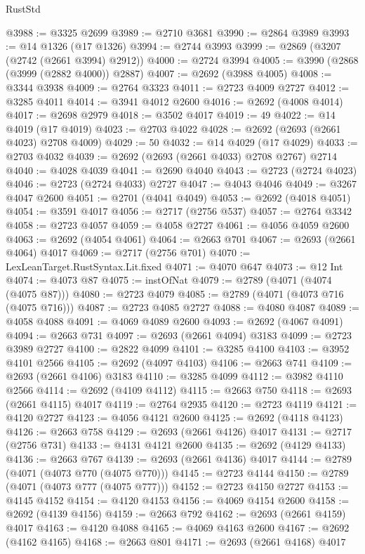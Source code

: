 \begin{lexlean}{RustStd}
\begin{coremodule}
@3988 := @3325 @2699
@3989 := @2710 @3681
@3990 := @2864 @3989
@3993 := @14 @1326 (@17 @1326)
@3994 := @2744 @3993
@3999 := @2869 (@3207 (@2742 (@2661 @3994) @2912))
@4000 := @2724 @3994
@4005 := @3990 (@2868 (@3999 (@2882 @4000)) @2887)
@4007 := @2692 (@3988 @4005)
@4008 := @3344 @3938
@4009 := @2764 @3323
@4011 := @2723 @4009 @2727
@4012 := @3285 @4011
@4014 := @3941 @4012 @2600
@4016 := @2692 (@4008 @4014)
@4017 := @2698 @2979
@4018 := @3502 @4017
@4019 := 49
@4022 := @14 @4019 (@17 @4019)
@4023 := @2703 @4022
@4028 := @2692 (@2693 (@2661 @4023) @2708 @4009)
@4029 := 50
@4032 := @14 @4029 (@17 @4029)
@4033 := @2703 @4032
@4039 := @2692 (@2693 (@2661 @4033) @2708 @2767) @2714
@4040 := @4028 @4039
@4041 := @2690 @4040
@4043 := @2723 (@2724 @4023)
@4046 := @2723 (@2724 @4033) @2727
@4047 := @4043 @4046
@4049 := @3267 @4047 @2600
@4051 := @2701 (@4041 @4049)
@4053 := @2692 (@4018 @4051)
@4054 := @3591 @4017
@4056 := @2717 (@2756 @537)
@4057 := @2764 @3342
@4058 := @2723 @4057
@4059 := @4058 @2727
@4061 := @4056 @4059 @2600
@4063 := @2692 (@4054 @4061)
@4064 := @2663 @701
@4067 := @2693 (@2661 @4064) @4017
@4069 := @2717 (@2756 @701)
@4070 := LexLeanTarget.RustSyntax.Lit.fixed
@4071 := @4070 @647
@4073 := @12 Int
@4074 := @4073 @87
@4075 := instOfNat
@4079 := @2789 (@4071 (@4074 (@4075 @87)))
@4080 := @2723 @4079
@4085 := @2789 (@4071 (@4073 @716 (@4075 @716)))
@4087 := @2723 @4085 @2727
@4088 := @4080 @4087
@4089 := @4058 @4088
@4091 := @4069 @4089 @2600
@4093 := @2692 (@4067 @4091)
@4094 := @2663 @731
@4097 := @2693 (@2661 @4094) @3183
@4099 := @2723 @3989 @2727
@4100 := @2822 @4099
@4101 := @3285 @4100
@4103 := @3952 @4101 @2566
@4105 := @2692 (@4097 @4103)
@4106 := @2663 @741
@4109 := @2693 (@2661 @4106) @3183
@4110 := @3285 @4099
@4112 := @3982 @4110 @2566
@4114 := @2692 (@4109 @4112)
@4115 := @2663 @750
@4118 := @2693 (@2661 @4115) @4017
@4119 := @2764 @2935
@4120 := @2723 @4119
@4121 := @4120 @2727
@4123 := @4056 @4121 @2600
@4125 := @2692 (@4118 @4123)
@4126 := @2663 @758
@4129 := @2693 (@2661 @4126) @4017
@4131 := @2717 (@2756 @731)
@4133 := @4131 @4121 @2600
@4135 := @2692 (@4129 @4133)
@4136 := @2663 @767
@4139 := @2693 (@2661 @4136) @4017
@4144 := @2789 (@4071 (@4073 @770 (@4075 @770)))
@4145 := @2723 @4144
@4150 := @2789 (@4071 (@4073 @777 (@4075 @777)))
@4152 := @2723 @4150 @2727
@4153 := @4145 @4152
@4154 := @4120 @4153
@4156 := @4069 @4154 @2600
@4158 := @2692 (@4139 @4156)
@4159 := @2663 @792
@4162 := @2693 (@2661 @4159) @4017
@4163 := @4120 @4088
@4165 := @4069 @4163 @2600
@4167 := @2692 (@4162 @4165)
@4168 := @2663 @801
@4171 := @2693 (@2661 @4168) @4017

\end{coremodule}
\end{lexlean}
